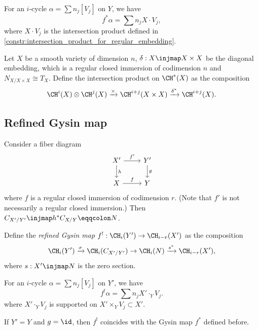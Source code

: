   For an $i$-cycle $\alpha = \sum n_j [V_j]$ on $Y$, we have
  \[ f^* \alpha = \sum n_j X \cdot V_j, \]
  where $X \cdot V_j$ is the intersection product defined in \cref{constr:intersection_product_for_regular_embedding}.

  \begin{definition}
    Let $X$ be a smooth variety of dimension $n$, $\delta: X \injmap X \times X$ be the diagonal embedding, which is a regular closed immersion of codimension $n$ and $N_{X/X \times X} \cong T_X$.
    Define the intersection product on $\CH^*(X)$ as the composition
    \[ \CH^i(X) \otimes \CH^j(X) \xrightarrow{\times} \CH^{i+j}(X \times X) \xrightarrow{\delta^*} \CH^{i+j}(X). \]
  \end{definition}


\subsection{Refined Gysin map}

  Consider a fiber diagram
  \[ \begin{tikzcd}
    X' \ar[d, "h"] \ar[r, "f'"] & Y' \ar[d, "g"] \\
    X \ar[r, "f"] & Y
  \end{tikzcd} \]
  where $f$ is a regular closed immersion of codimension $r$.
  (Note that $f'$ is not necessarily a regular closed immersion.)
  Then $C_{X'/Y'} \injmap h^* C_{X/Y} \eqqcolon N$.

  \begin{definition}
    Define the \emph{refined Gysin map} $f^!: \CH_i(Y') \to \CH_{i-r}(X')$ as the composition
    \[ \CH_i(Y') \xrightarrow{\sigma} \CH_i(C_{X'/Y'}) \to \CH_i(N) \xrightarrow{s^*} \CH_{i-r}(X'), \]
    where $s: X' \injmap N$ is the zero section.
  \end{definition}

  For an $i$-cycle $\alpha = \sum n_j [V_j]$ on $Y'$, we have
  \[ f^! \alpha = \sum n_j X' \cdot_{Y} V_j. \]
  where $X' \cdot_Y V_j$ is supported on $X' \times_Y V_j \subset X'$.
  
  If $Y' = Y$ and $g = \id$, then $f^!$ coincides with the Gysin map $f^*$ defined before.

